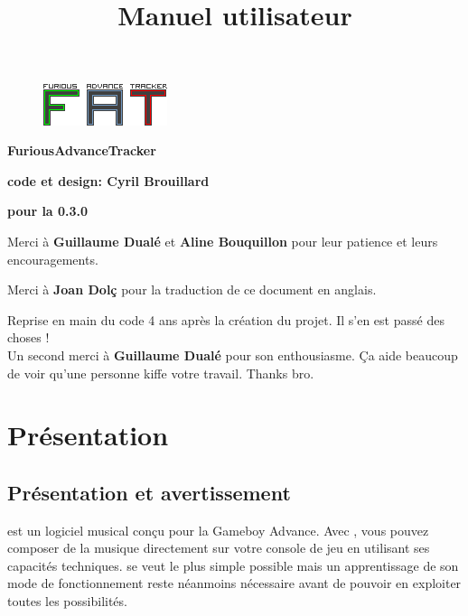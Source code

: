 \documentclass[12pt,a4paper]{article}
\title{\bf \SimpleImage{images/furicat_color}{0.3} \\ Manuel utilisateur}
\author{\fatversion}
\begin{document}
  \begin{figure}
    \begin{center}
    \includegraphics[scale=2]{images/logo}
    \end{center}
  \end{figure}
  \maketitle{}
  \thispagestyle{empty}
  \setcounter{page}{0}
  \ClearShipoutPicture

  \newpage

  \begin{center}
  
  {\bf \FAT FuriousAdvanceTracker} \medskip
  
  {\bf code et design: Cyril Brouillard} \medskip

  {\bf pour la 0.3.0} \medskip
  
  Merci à {\bf \textcolor{vert}{Guillaume Dualé}} et {\bf \textcolor{vert}{Aline Bouquillon}} pour leur patience et leurs encouragements.\medskip
  
  Merci à {\bf \textcolor{vert}{Joan Dolç}} pour la traduction de ce document en anglais. \medskip

  {\bf \fatversion} \medskip

  Reprise en main du code 4 ans après la création du projet. Il s'en est passé des choses ! \\
  Un second merci à {\bf \textcolor{vert}{Guillaume Dualé}} pour son enthousiasme. Ça aide beaucoup de voir qu'une personne kiffe votre travail. Thanks bro.

  \end{center}
  
  \thispagestyle{empty}
  \setcounter{page}{0}
  \ClearShipoutPicture
  \newpage
  
  \tableofcontents{}
  \newpage
  
  \section{Présentation}
    \subsection{Présentation et avertissement}
    \FAT est un logiciel musical conçu pour la Gameboy Advance.
    Avec \FAT, vous pouvez composer de la musique directement sur votre console de jeu en utilisant ses capacités techniques.
    \FAT se veut le plus simple possible mais un apprentissage de son mode de fonctionnement reste néanmoins nécessaire avant de pouvoir en exploiter toutes les possibilités.\medskip
    
\end{document}
